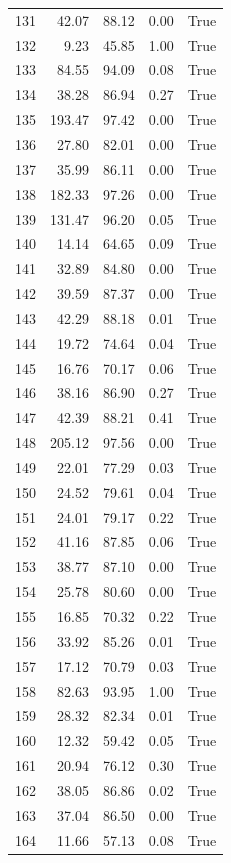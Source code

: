 \begin{longtable}{rrrrr}
131 & 42.07 & 88.12 & 0.00 & True \\
132 & 9.23 & 45.85 & 1.00 & True \\
133 & 84.55 & 94.09 & 0.08 & True \\
134 & 38.28 & 86.94 & 0.27 & True \\
135 & 193.47 & 97.42 & 0.00 & True \\
136 & 27.80 & 82.01 & 0.00 & True \\
137 & 35.99 & 86.11 & 0.00 & True \\
138 & 182.33 & 97.26 & 0.00 & True \\
139 & 131.47 & 96.20 & 0.05 & True \\
140 & 14.14 & 64.65 & 0.09 & True \\
141 & 32.89 & 84.80 & 0.00 & True \\
142 & 39.59 & 87.37 & 0.00 & True \\
143 & 42.29 & 88.18 & 0.01 & True \\
144 & 19.72 & 74.64 & 0.04 & True \\
145 & 16.76 & 70.17 & 0.06 & True \\
146 & 38.16 & 86.90 & 0.27 & True \\
147 & 42.39 & 88.21 & 0.41 & True \\
148 & 205.12 & 97.56 & 0.00 & True \\
149 & 22.01 & 77.29 & 0.03 & True \\
150 & 24.52 & 79.61 & 0.04 & True \\
151 & 24.01 & 79.17 & 0.22 & True \\
152 & 41.16 & 87.85 & 0.06 & True \\
153 & 38.77 & 87.10 & 0.00 & True \\
154 & 25.78 & 80.60 & 0.00 & True \\
155 & 16.85 & 70.32 & 0.22 & True \\
156 & 33.92 & 85.26 & 0.01 & True \\
157 & 17.12 & 70.79 & 0.03 & True \\
158 & 82.63 & 93.95 & 1.00 & True \\
159 & 28.32 & 82.34 & 0.01 & True \\
160 & 12.32 & 59.42 & 0.05 & True \\
161 & 20.94 & 76.12 & 0.30 & True \\
162 & 38.05 & 86.86 & 0.02 & True \\
163 & 37.04 & 86.50 & 0.00 & True \\
164 & 11.66 & 57.13 & 0.08 & True \\

\end{longtable}
